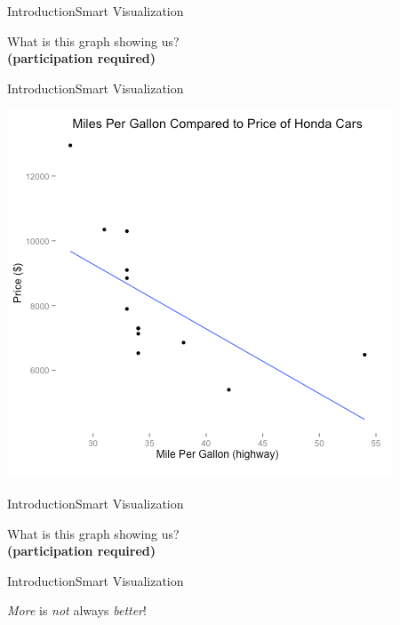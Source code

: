 \begin{frame}{Introduction}{Smart Visualization}
  \begin{center}
      What is this graph showing us? \\
      \textbf{(participation required)}
  \end{center}
  \end{frame}

\begin{frame}{Introduction}{Smart Visualization}
  \begin{center}
      \includegraphics[scale=0.4]{images/good.pdf}
  \end{center}
  \end{frame}

\begin{frame}{Introduction}{Smart Visualization}
  \begin{center}
      What is this graph showing us? \\
      \textbf{(participation required)}
  \end{center}
  \end{frame}

\begin{frame}{Introduction}{Smart Visualization}
  \begin{center}
      \textit{More} is \textit{not} always \textit{better}!
  \end{center}
\end{frame}
